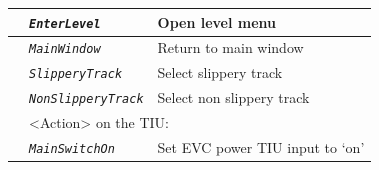 \documentclass{template/openetcs}
\begin{document}
\begin{itemize}
\begin{longtable}{|l|l|l|}
			\hline
			
			&	\begin{minipage}[t]{0.40\linewidth} \emph{\texttt{EnterLevel}} \end{minipage}
			&	\begin{minipage}[t]{0.38\linewidth} Open level menu \end{minipage} \\
			
			\hline
			
			&	\begin{minipage}[t]{0.40\linewidth} \emph{\texttt{MainWindow}} \end{minipage}
			&	\begin{minipage}[t]{0.38\linewidth} Return to main window \end{minipage} \\
			
			\hline
			
			&	\begin{minipage}[t]{0.40\linewidth} \emph{\texttt{SlipperyTrack}} \end{minipage}
			&	\begin{minipage}[t]{0.38\linewidth} Select slippery track \end{minipage} \\
			
			\hline
			
			&	\begin{minipage}[t]{0.40\linewidth} \emph{\texttt{NonSlipperyTrack}} \end{minipage}
			&	\begin{minipage}[t]{0.38\linewidth} Select non slippery track \end{minipage} \\
			
			\hline
			
			&	\multicolumn{2}{l|}{ \begin{minipage}[t]{0.78\linewidth} <Action> on the TIU: \end{minipage} } \\
			
			\hline
			
			&	\begin{minipage}[t]{0.40\linewidth} \emph{\texttt{MainSwitchOn}} \end{minipage}
			&	\begin{minipage}[t]{0.38\linewidth} Set EVC power TIU input to ‘on’ \end{minipage} \\
			

\end{longtable}
\end{itemize}
\end{document}
